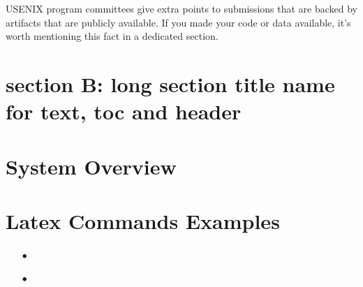 USENIX program committees give extra points to submissions that are backed by artifacts that are publicly available. If you made your code or data available, it's worth mentioning this fact in a dedicated section.\par

\section[section B: manage long chap name]{section B: long section title name for text, toc and header}
\zhlipsum[8-12]

\section{System Overview}
\zhlipsum[9-13]

\section{Latex Commands Examples}

\begin{itemize}
    \item[$\bullet$] \lipsum[1]
    \item[$\bullet$] \lipsum[2]
\end{itemize}
%
